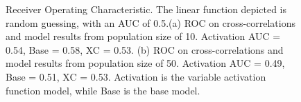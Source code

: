 \documentclass[11pt,titlepage]{article}
\begin{document}
\begin{figure}[H]
\begin{minipage}{0.49\linewidth}
\captionsetup{position=top}
\end{minipage}
\begin{minipage}{0.50\linewidth}
\captionsetup{position=top}
\end{minipage}
\caption[Receiver Operating Characteristic]{Receiver Operating Characteristic. The linear function depicted is random guessing, with an AUC of 0.5.(a) ROC on cross-correlations and model results from population size of 10. Activation AUC = 0.54, Base = 0.58, XC = 0.53. (b) ROC on cross-correlations and model results from population size of 50. Activation AUC = 0.49, Base = 0.51, XC = 0.53. Activation is the variable activation function model, while Base is the base model.}
\label{fig:roc}
\end{figure}
\end{document}
